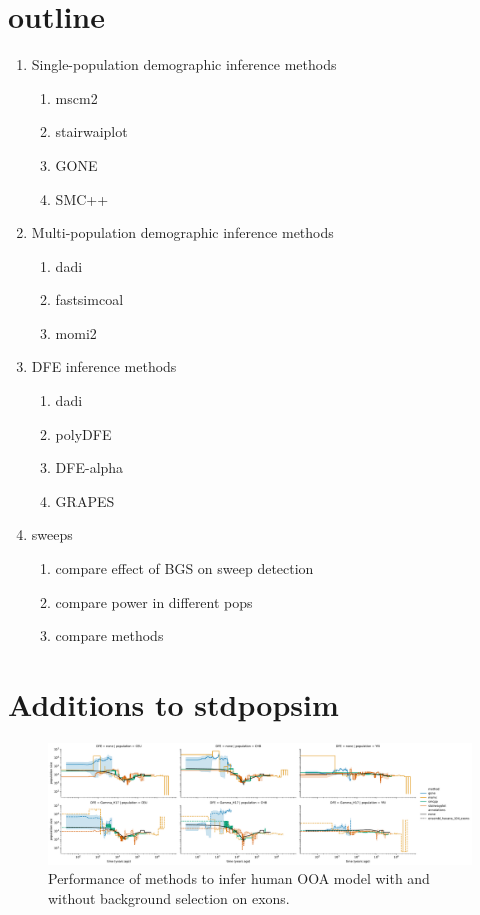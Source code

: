 \documentclass[hidelinks]{article}
\begin{document}
\section*{outline}
    \label{outline}
    \begin{enumerate}
        \item Single-population demographic inference methods
        \begin{enumerate}
            \item mscm2
            \item stairwaiplot
            \item GONE
            \item SMC++
        \end{enumerate}
        \item Multi-population demographic inference methods
        \begin{enumerate}
            \item dadi
            \item fastsimcoal
            \item momi2
        \end{enumerate}
        \item DFE inference methods
        \begin{enumerate}
            \item dadi
            \item polyDFE
            \item DFE-alpha
            \item GRAPES
        \end{enumerate} 
        \item sweeps
        \begin{enumerate}
            \item compare effect of BGS on sweep detection
            \item compare power in different pops
            \item compare methods
        \end{enumerate}
    \end{enumerate}

    




\section*{Additions to stdpopsim}
    \label{additions}


    \begin{figure}[ht]
        \centering
        \includegraphics[width=\textwidth]{figures/HomSap/estimated_Ne_t_final}
        \caption{
        \label{fig:demography}
        Performance of methods to infer human OOA model
        with and without background selection on exons.
        }
    \end{figure}
\end{document}
